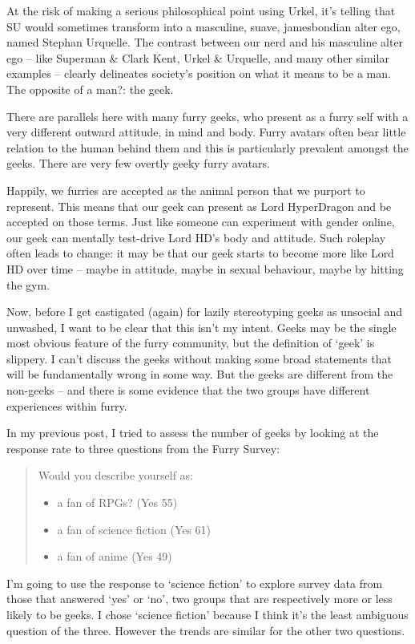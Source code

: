 At the risk of making a serious philosophical point using Urkel, it's telling that SU would sometimes transform into a masculine, suave, jamesbondian alter ego, named Stephan Urquelle. The contrast between our nerd and his masculine alter ego -- like Superman \& Clark Kent, Urkel \& Urquelle, and many other similar examples -- clearly delineates society's position on what it means to be a man. The opposite of a man?: the geek.

There are parallels here with many furry geeks, who present as a furry self with a very different outward attitude, in mind and body. Furry avatars often bear little relation to the human behind them and this is particularly prevalent amongst the geeks. There are very few overtly geeky furry avatars.

Happily, we furries are accepted as the animal person that we purport to represent. This means that our geek can present as Lord HyperDragon and be accepted on those terms. Just like someone can experiment with gender online, our geek can mentally test-drive Lord HD's body and attitude. Such roleplay often leads to change: it may be that our geek starts to become more like Lord HD over time -- maybe in attitude, maybe in sexual behaviour, maybe by hitting the gym.

Now, before I get castigated (again) for lazily stereotyping geeks as unsocial and unwashed, I want to be clear that this isn't my intent. Geeks may be the single most obvious feature of the furry community, but the definition of `geek' is slippery. I can't discuss the geeks without making some broad statements that will be fundamentally wrong in some way. But the geeks are different from the non-geeks -- and there is some evidence that the two groups have different experiences within furry.

In my previous post, I tried to assess the number of geeks by looking at the response rate to three questions from the Furry Survey:

\begin{quotation}
  Would you describe yourself as:
  \begin{itemize}
    \item a fan of RPGs? (Yes 55)
    \item a fan of science fiction (Yes 61)
    \item a fan of anime (Yes 49)
  \end{itemize}
\end{quotation}

I'm going to use the response to `science fiction' to explore survey data from those that answered `yes' or `no', two groups that are respectively more or less likely to be geeks. I chose `science fiction' because I think it's the least ambiguous question of the three. However the trends are similar for the other two questions.

